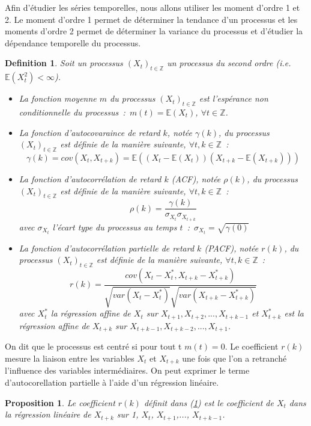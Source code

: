 \documentclass[11pt]{scrartcl} %
\newtheorem{Def}[theorem]{Definition}
\newtheorem{pro}[theorem]{Proposition}
\newcommand{\Xt}{\left(X_t\right)_{t\in\mathbb{Z}}}
\newcommand{\Z}{\mathbb{Z}}
\newcommand{\E}[1]{\mathbb{E}\left(#1\right)}
\begin{document}
Afin d'étudier les séries temporelles, nous allons utiliser les moment d'ordre 1 et 2. Le moment d'ordre 1 permet de déterminer la tendance d'un processus et les moments d'ordre 2 permet de déterminer la variance du processus et d'étudier la dépendance temporelle du processus.
\begin{Def}\label{defMom}
Soit un processus $\Xt$ un processus du second ordre (i.e. $\E{X_t^2}<\infty$).
\begin{itemize}
\item[i)]La fonction moyenne $m$ du processus $\Xt$ est l'espérance non conditionnelle du processus~:~$m(t)=\E{X_t}$, $\forall t\in \Z$.
\item[ii)]La fonction d'autocovaraince de retard $k$, notée $\gamma(k)$, du processus $\Xt$ est définie de la manière suivante, $\forall t, k\in\Z$~:
$$
\gamma(k)=cov\left(X_t,X_{t+k}\right)=\E{\left(X_t-\E{X_t}\right)\left(X_{t+k}-\E{X_{t+k}}\right)}
$$
\item[iii)]La fonction d'autocorrélation de retard $k$ (ACF), notée $\rho(k)$, du processus $\Xt$ est définie de la manière suivante, $\forall t, k\in\Z$~:
$$
\rho(k)=\frac{\gamma(k)}{\sigma_{X_t}\sigma_{X_{t+k}}}
$$
avec $\sigma_{X_t}$ l'écart type du processus au temps $t$~:~$\sigma_{X_t}=\sqrt{\gamma(0)}$
\item[iv)]La fonction d'autocorrélation partielle de retard $k$ (PACF), notée $r(k)$, du processus $\Xt$ est définie de la manière suivante, $\forall t, k\in\Z$~:
$$
r(k)=\frac{cov(X_t-X_t^*,X_{t+k}-X_{t+k}^*)}{\sqrt{var(X_t-X_t^*)}\sqrt{var(X_{t+k}-X_{t+k}^*)}}
$$
avec $X_t^*$ la régression affine de $X_t$ sur $X_{t+1},X_{t+2},..., X_{t+k-1}$ et $X^*_{t+k}$ est la régression affine de $X_{t+k}$ sur $X_{t+k-1},X_{t+k-2},...,X_{t+1}$.
\end{itemize}
\end{Def}
On dit que le processus est centré si pour tout t $m(t)=0$. Le coefficient $r(k)$ mesure la liaison entre les variables $X_t$ et $X_{t+k}$ une fois que l'on a retranché l'influence des variables intermédiaires. On peut exprimer le terme d'autocorellation partielle à l'aide d'un régression linéaire.
\begin{pro}
Le coefficient $r(k)$ définit dans (\ref{defMom}) est le coefficient de $X_t$ dans la régression linéaire de $X_{t+k}$ sur 1, $X_t$, $X_{t+1}$,..., $X_{t+k-1}$.
\end{pro}
\end{document}
